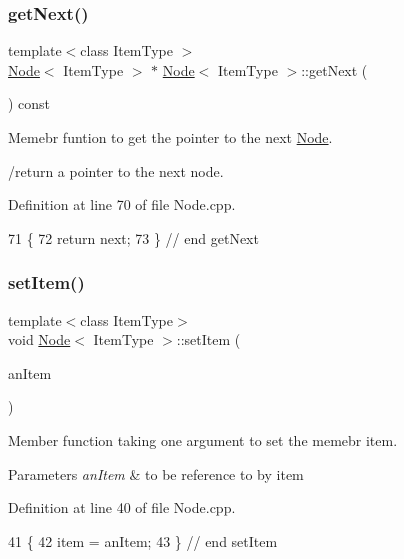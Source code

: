 \subsubsection{\texorpdfstring{get\+Next()}{getNext()}}
{\footnotesize\ttfamily template$<$class Item\+Type $>$ \\
\hyperlink{classNode}{Node}$<$ Item\+Type $>$ $\ast$ \hyperlink{classNode}{Node}$<$ Item\+Type $>$\+::get\+Next (\begin{DoxyParamCaption}{ }\end{DoxyParamCaption}) const}



Memebr funtion to get the pointer to the next \hyperlink{classNode}{Node}. 

/return a pointer to the next node. 

Definition at line 70 of file Node.\+cpp.


\begin{DoxyCode}
71 \{
72     \textcolor{keywordflow}{return} next;
73 \} \textcolor{comment}{// end getNext}
\end{DoxyCode}
\mbox{\label{classNode_ab4ceecdecc5df799011de486b9f54974}} 
\subsubsection{\texorpdfstring{set\+Item()}{setItem()}}
{\footnotesize\ttfamily template$<$class Item\+Type$>$ \\
void \hyperlink{classNode}{Node}$<$ Item\+Type $>$\+::set\+Item (\begin{DoxyParamCaption}\item[{const Item\+Type \&}]{an\+Item }\end{DoxyParamCaption})}



Member function taking one argument to set the memebr item. 


\begin{DoxyParams}{Parameters}
{\em an\+Item} & to be reference to by item \\
\hline
\end{DoxyParams}


Definition at line 40 of file Node.\+cpp.


\begin{DoxyCode}
41 \{
42     item = anItem;
43 \} \textcolor{comment}{// end setItem}
\end{DoxyCode}
\mbox{\label{classNode_a01c1a66d4e39f5b149e090413deb4633}} 
